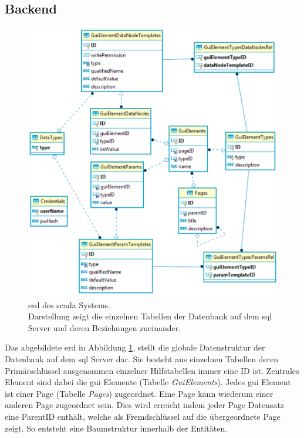 \subsection{Backend}\label{subsec::dataBackend}
\begin{figure}[ht]
  \centering
  \includegraphics[width=\textwidth]{content/hauptteil/systemEntwurf/res/erd.pdf}
  \caption[\acs{erd} des \acs{scada} Systems]{\acs{erd} des \ac{scada} Systems.\\
    Darstellung zeigt die einzelnen Tabellen der Datenbank auf dem \ac{sql} Server und deren Beziehungen zueinander.}
  \label{img:erd}
\end{figure}
Das abgebildete \ac{erd} in Abbildung \ref{img:erd}, stellt die globale Datenstruktur der Datenbank auf dem \ac{sql} Server dar.
Sie besteht aus einzelnen Tabellen deren Primärschlüssel ausgenommen einzelner Hilfstabellen immer eine ID ist.
Zentrales Element sind dabei die \ac{gui} Elemente (Tabelle \emph{GuiElements}). Jedes \ac{gui} Element ist einer Page (Tabelle \emph{Pages}) zugeordnet. 
Eine Page kann wiederum einer anderen Page zugeordnet sein. 
Dies wird erreicht indem jeder Page Datensatz eine ParentID enthält, welche als Fremdschlüssel auf die übergeordnete Page zeigt. So entsteht eine Baumstruktur innerhalb der Entitäten.
